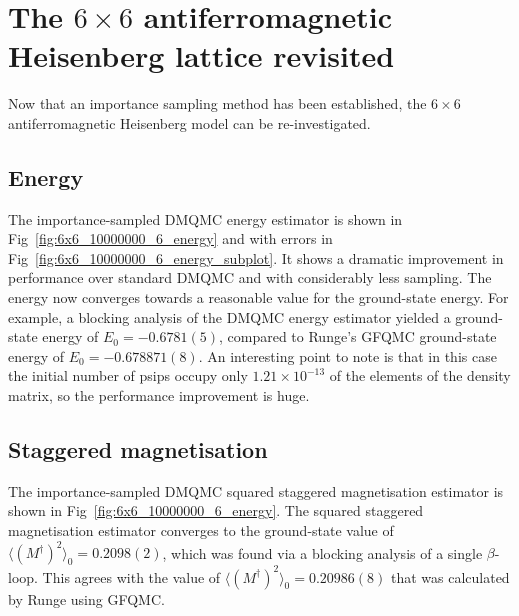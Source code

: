 \section{The $6\times6$ antiferromagnetic Heisenberg lattice revisited}
Now that an importance sampling method has been established, the $6\times6$ antiferromagnetic Heisenberg model can be re-investigated. 
\subsection{Energy}
The importance-sampled DMQMC energy estimator is shown in Fig~\ref{fig:6x6_10000000_6_energy} and with errors in Fig~\ref{fig:6x6_10000000_6_energy_subplot}. It shows a dramatic improvement in performance over standard DMQMC and with considerably less sampling. The energy now converges towards a reasonable value for the ground-state energy. For example, a blocking analysis of the DMQMC energy estimator yielded a ground-state energy of $E_0 = -0.6781(5)$, compared to Runge's GFQMC ground-state energy\cite{Runge1992} of $E_0 = -0.678871(8)$. An interesting point to note is that in this case the initial number of psips occupy only $1.21\times10^{-13}$ of the elements of the density matrix, so the performance improvement is huge.

\subsection{Staggered magnetisation}

The importance-sampled DMQMC squared staggered magnetisation estimator is shown in Fig~\ref{fig:6x6_10000000_6_energy}. The squared staggered magnetisation estimator converges to the ground-state value of $\langle (M^{\dagger})^2\rangle_0 = 0.2098(2)$, which was found via a blocking analysis of a single $\beta$-loop. This agrees with the value of $\langle (M^{\dagger})^2\rangle_0 = 0.20986(8)$ that was calculated by Runge using GFQMC\cite{Runge1992a}.

